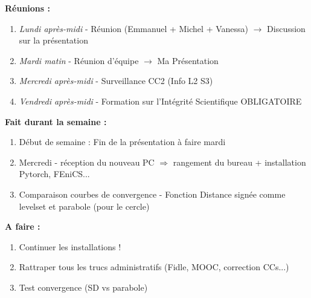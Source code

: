 \textbf{Réunions :}
\begin{enumerate}[label=\textbullet]
	\item \textit{Lundi après-midi} - Réunion (Emmanuel + Michel + Vanessa) $\rightarrow$ Discussion sur la présentation
	\item \textit{Mardi matin} - Réunion d'équipe $\rightarrow$ Ma Présentation
	\item \textit{Mercredi après-midi} - Surveillance CC2 (Info L2 S3)
	\item \textit{Vendredi après-midi} - Formation sur l'Intégrité Scientifique OBLIGATOIRE
\end{enumerate}
\textbf{Fait durant la semaine :}
\begin{enumerate}[label=\textbullet]
	\item Début de semaine : Fin de la présentation à faire mardi
	\item Mercredi - réception du nouveau PC $\Rightarrow$ rangement du bureau + installation Pytorch, FEniCS...
	\item Comparaison courbes de convergence - Fonction Distance signée comme levelset et parabole (pour le cercle)
\end{enumerate}
\textbf{A faire :}
\begin{enumerate}[label=\textbullet]
	\item Continuer les installations !
	\item Rattraper tous les trucs administratifs (Fidle, MOOC, correction CCs...)
	\item Test convergence (SD vs parabole)
\end{enumerate}